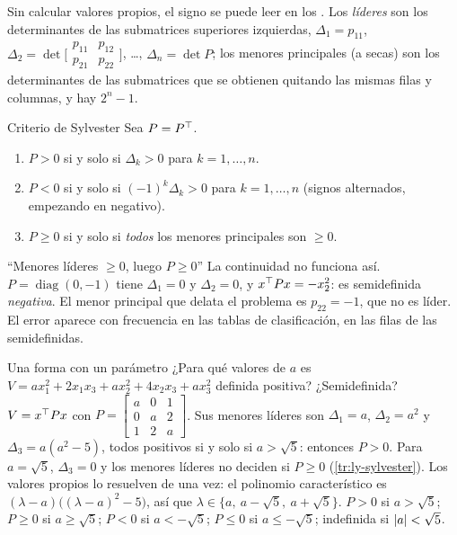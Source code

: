 Sin calcular valores propios, el signo se puede leer en los . Los \emph{líderes} son los determinantes de las submatrices superiores izquierdas, $\Delta_1=p_{11}$, $\Delta_2=\det\bigl[\begin{smallmatrix}p_{11}&p_{12}\\p_{21}&p_{22}\end{smallmatrix}\bigr]$, \dots, $\Delta_n=\det P$; los menores principales (a secas) son los determinantes de las submatrices que se obtienen quitando las mismas filas y columnas, y hay $2^n-1$.

\begin{teorema}[label=thm:ly-sylvester]{Criterio de Sylvester}
Sea $P=P^{\top}$.
\begin{enumerate}
  \item $P>0$ si y solo si $\Delta_k>0$ para $k=1,\dots,n$.
  \item $P<0$ si y solo si $(-1)^k\Delta_k>0$ para $k=1,\dots,n$ (signos alternados, empezando en negativo).
  \item $P\ge0$ si y solo si \emph{todos} los menores principales son $\ge0$.
\end{enumerate}
\end{teorema}

\begin{trampa}[label=tr:ly-sylvester]{``Menores líderes $\ge0$, luego $P\ge0$''}
La continuidad no funciona así. $P=\operatorname{diag}(0,-1)$ tiene $\Delta_1=0$ y $\Delta_2=0$, y $x^{\top} Px=-x_2^2$: es semidefinida \emph{negativa}. El menor principal que delata el problema es $p_{22}=-1$, que no es líder. El error aparece con frecuencia en las tablas de clasificación, en las filas de las semidefinidas.
\end{trampa}

\begin{ejemplo}[label=ej:ly-Pa]{Una forma con un parámetro}
¿Para qué valores de $a$ es $V=ax_1^2+2x_1x_3+ax_2^2+4x_2x_3+ax_3^2$ definida positiva? ¿Semidefinida?
\solucion $V=x^{\top} Px$ con $P=\begin{bmatrix}a&0&1\\0&a&2\\1&2&a\end{bmatrix}$. Sus menores líderes son $\Delta_1=a$, $\Delta_2=a^2$ y $\Delta_3=a(a^2-5)$, todos positivos si y solo si $a>\sqrt5$: entonces $P>0$. Para $a=\sqrt5$, $\Delta_3=0$ y los menores líderes no deciden si $P\ge0$ (\cref{tr:ly-sylvester}). Los valores propios lo resuelven de una vez: el polinomio característico es $(\lambda-a)\bigl((\lambda-a)^2-5\bigr)$, así que $\lambda\in\{a,\ a-\sqrt5,\ a+\sqrt5\}$. $P>0$ si $a>\sqrt5$; $P\ge0$ si $a\ge\sqrt5$; $P<0$ si $a<-\sqrt5$; $P\le0$ si $a\le-\sqrt5$; indefinida si $\left\lvert a\right\rvert<\sqrt5$.
\end{ejemplo}


